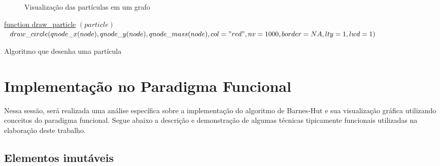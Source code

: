 \documentclass[rel_mlp]{iiufrgs}
\begin{document}
\begin{figure}[htb]
    \centering
    \caption{Visualização das partículas em um grafo}
    \label{fig:particulas.eps}
\end{figure}


\begin{algorithm}
	\label{draw_particle}
    \underline{function draw{\_}particle} $(particle)$\;
  	$	draw{\_}circle(qnode{\_}x(node), qnode{\_}y(node), qnode{\_}mass (node), col="red", nv=1000, border = NA,lty=1,lwd=1) $\;
    \caption{Algoritmo que desenha uma partícula}
\end{algorithm}

\section{Implementação no Paradigma Funcional}

    Nessa sessão, será realizada uma análise específica sobre a implementação do algoritmo de Barnes-Hut
    e sua visualização gráfica utilizando conceitos do paradigma funcional.
	Segue abaixo a descrição e demonstração de algumas técnicas tipicamente funcionais
    utilizadas na elaboração deste trabalho.

    \subsection{Elementos imutáveis}
\end{document}
